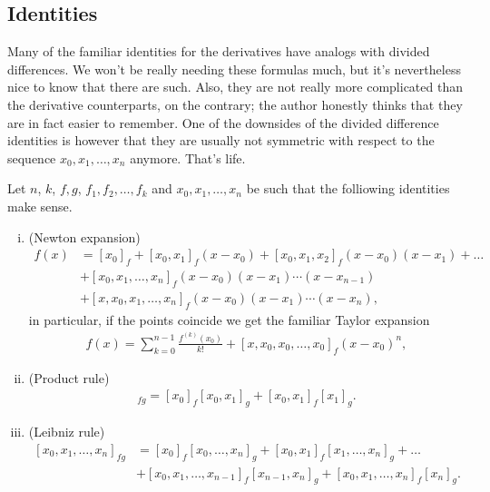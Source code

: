 \subsection{Identities}

Many of the familiar identities for the derivatives have analogs with divided differences. We won't be really needing these formulas much, but it's nevertheless nice to know that there are such. Also, they are not really more complicated than the derivative counterparts, on the contrary; the author honestly thinks that they are in fact easier to remember. One of the downsides of the divided difference identities is however that they are usually not symmetric with respect to the sequence $x_{0}, x_{1}, \ldots, x_{n}$ anymore. That's life.

\begin{prop}
	Let $n$, $k$, $f, g$, $f_{1}, f_{2}, \ldots, f_{k}$ and $x_{0}, x_{1}, \ldots, x_{n}$ be such that the folliowing identities make sense.
	\begin{enumerate}[(i)]
		\item (Newton expansion)
		\begin{align}\label{newton_expansion}
			f(x) &= [x_{0}]_{f} + [x_{0}, x_{1}]_{f} (x - x_{0})  + [x_{0}, x_{1}, x_{2}]_{f} (x - x_{0}) (x - x_{1}) + \ldots \\
			& + [x_{0}, x_{1}, \ldots, x_{n}]_{f} (x - x_{0}) (x - x_{1}) \cdots (x - x_{n - 1}) \nonumber\\
			& + [x, x_{0}, x_{1}, \ldots, x_{n}]_{f} (x - x_{0}) (x - x_{1}) \cdots (x - x_{n}) \nonumber,
		\end{align}
		in particular, if the points coincide we get the familiar Taylor expansion
		\begin{align}\label{taylor_expansion}
			f(x) = \sum_{k = 0}^{n - 1} \frac{f^{(k)}(x_{0})}{k!} + [x, x_{0}, x_{0}, \ldots, x_{0}]_{f} (x - x_{0})^{n},
		\end{align}
		\item (Product rule)
		\begin{align*}
			[x_{0}, x_{1}]_{f g} = [x_{0}]_{f} [x_{0}, x_{1}]_{g} + [x_{0}, x_{1}]_{f} [x_{1}]_{g}.
		\end{align*}
		\item (Leibniz rule)
		\begin{align}\label{leibniz_rule}
			[x_{0}, x_{1}, \ldots, x_{n}]_{f g} &= [x_{0}]_{f} [x_{0}, \ldots, x_{n}]_{g} + [x_{0}, x_{1}]_{f} [x_{1}, \ldots, x_{n}]_{g} + \ldots\\
			&+ [x_{0}, x_{1}, \ldots, x_{n - 1}]_{f} [x_{n - 1}, x_{n}]_{g} + [x_{0}, x_{1}, \ldots, x_{n}]_{f} [x_{n}]_{g} \nonumber.

\end{align}
\end{enumerate}
\end{prop}
